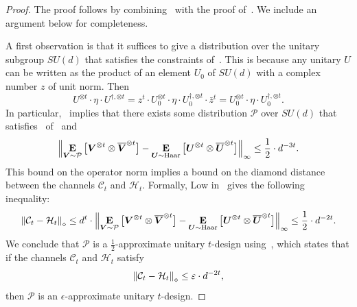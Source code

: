 \documentclass{article}
\begin{document}
\begin{proof}
    The proof follows by combining~\cite[Theorem 2.11]{OSP23} with the proof of~\cite[Corollary 1.2]{HLT24}. We include an argument below for completeness.

    A first observation is that it suffices to give a distribution over the unitary subgroup $SU(d)$ that satisfies the constraints of~. This is because any unitary $U$ can be written as the product of an element $U_0$ of $SU(d)$ with a complex number $z$ of unit norm. Then
    \begin{equation*}
        U^{\otimes t} \cdot \eta \cdot U^{\dagger, \otimes t} = z^t\cdot U_0^{\otimes t} \cdot \eta \cdot U_0^{\dagger, \otimes t} \cdot \bar{z}^t = U_0^{\otimes t} \cdot \eta \cdot U_0^{\dagger, \otimes t}.
    \end{equation*}
    In particular,~\cite[Theorem 2.11]{OSP23} implies that there exists some distribution $\mathcal{P}$ over $SU(d)$ that satisfies~ of~ and
    \begin{equation*}
        \norm{\mathop{\bf E\/}_{\boldsymbol{V} \sim \mathcal{P}} \big[\boldsymbol{V}^{\otimes t} \otimes \overline{\boldsymbol{V}}^{\otimes t}\big] - \mathop{\bf E\/}_{\boldsymbol{U} \sim \mathrm{Haar}} \big[\boldsymbol{U}^{\otimes t} \otimes \overline{\boldsymbol{U}}^{\otimes t}\big]}_{\infty} \leq \frac{1}{2}\cdot d^{-3t}.
    \end{equation*}
    This bound on the operator norm implies a bound on the diamond distance between the channels $\mathcal{C}_t$ and $\mathcal{H}_t$. Formally, Low in~\cite[Lemma 2.2.14, Item 4]{Low10} gives the following inequality:
    \begin{equation*}
        \norm{\mathcal{C}_t - \mathcal{H}_t}_{\diamond} \leq d^t\cdot \norm{\mathop{\bf E\/}_{\boldsymbol{V} \sim \mathcal{P}} \big[\boldsymbol{V}^{\otimes t} \otimes \overline{\boldsymbol{V}}^{\otimes t}\big] - \mathop{\bf E\/}_{\boldsymbol{U} \sim \mathrm{Haar}} \big[\boldsymbol{U}^{\otimes t} \otimes \overline{\boldsymbol{U}}^{\otimes t}\big]}_{\infty} \leq \frac{1}{2} \cdot d^{-2t}.
    \end{equation*}
    We conclude that $\mathcal{P}$ is a $\frac{1}{2}$-approximate unitary $t$-design using~\cite[Lemma 3]{BHH16}, which states that if the channels $\mathcal{C}_t$ and $\mathcal{H}_t$ satisfy
    \begin{equation*}
        \norm{\mathcal{C}_t - \mathcal{H}_t}_{\diamond} \leq \varepsilon\cdot d^{-2t},
    \end{equation*}
    then $\mathcal{P}$ is an $\epsilon$-approximate unitary $t$-design.
\end{proof}
\end{document}
